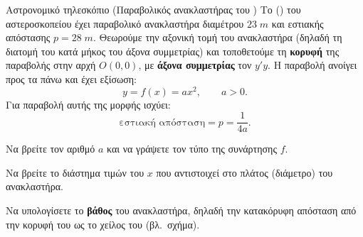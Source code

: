 \begin{problhma}{Αστρονομικό τηλεσκόπιο (Παραβολικός ανακλαστήρας του )}
Το  () του αστεροσκοπείου
 έχει παραβολικό ανακλαστήρα
διαμέτρου $23\;\si{m}$ και εστιακής απόστασης $p = 28\;\si{m}$. Θεωρούμε την αξονική τομή του ανακλαστήρα (δηλαδή τη διατομή του κατά
μήκος του άξονα συμμετρίας) και τοποθετούμε τη \textbf{κορυφή} της
παραβολής στην αρχή $O(0,0)$, με \textbf{άξονα συμμετρίας} τον $y'y$.
Η παραβολή ανοίγει προς τα πάνω και έχει εξίσωση:
\[
  y = f(x) = ax^2, \qquad a > 0.
\]
Για παραβολή αυτής της μορφής ισχύει:
\[
  \text{εστιακή απόσταση} = p = \frac{1}{4a}.
\]

\begin{alist}
  \item Να βρείτε τον αριθμό $a$ και να γράψετε τον τύπο της συνάρτησης $f$.
  \item Να βρείτε το διάστημα τιμών του $x$ που αντιστοιχεί στο πλάτος
        (διάμετρο) του ανακλαστήρα.
  \item Να υπολογίσετε το \textbf{βάθος} του ανακλαστήρα,
        δηλαδή την κατακόρυφη απόσταση από την κορυφή του ως το χείλος του
        (βλ.\ σχήμα).
\end{alist}

\begin{center}
\end{center}
\end{problhma}
